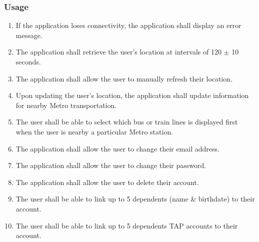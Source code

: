 	\subsubsection{Usage}\begin{enumerate}
		\item If the application loses connectivity, the application shall display an error message.
		\item The application shall retrieve the user’s location at intervals of 120 $\pm$ 10 seconds.
		\item The application shall allow the user to manually refresh their location.
		\item Upon updating the user’s location, the application shall update information for nearby Metro transportation.
		\item The user shall be able to select which bus or train lines is displayed first when the user is nearby a particular Metro station.
		\item The application shall allow the user to change their email address.
		\item The application shall allow the user to change their password.
		\item The application shall allow the user to delete their account.
		\item The user shall be able to link up to 5 dependents (name \& birthdate) to their account.
		\item The user shall be able to link up to 5 dependents TAP accounts to their account.
	\end{enumerate}
	
